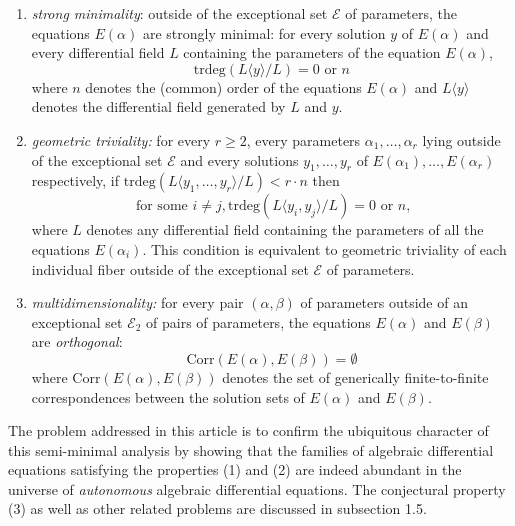 \documentclass[12pt]{amsart}
\theoremstyle{definition}
\theoremstyle{plain}
\theoremstyle{exampstyle}
\theoremstyle{exampstyle}\newtheorem{thmxbis}{Theorem}
\numberwithin{equation}{section}
\theoremstyle{remark}
\begin{document}
\begin{enumerate} 
\item {\em strong minimality}: outside of the exceptional set $\mathcal E$ of parameters,  the equations $E(\alpha)$ are  strongly minimal: for every solution $y$ of $E(\alpha)$ and every differential field $L$ containing the parameters of the equation $E(\alpha)$,
$$ \mathrm{trdeg}(L\langle y \rangle / L )  = 0 \text{ or } n$$
where $n$ denotes the (common) order of the equations $E(\alpha)$ and $L\langle y \rangle$ denotes the differential field generated by $L$ and $y$.

\item {\em geometric triviality:} for every $r \geq 2$, every parameters $\alpha_1,\ldots,\alpha_r$ lying outside of the exceptional set $\mathcal E$ and every solutions $y_1,\ldots, y_r$ of $E(\alpha_1),\ldots, E(\alpha_r)$ respectively, if $\mathrm{trdeg}(L\langle y_1,\ldots, y_r \rangle /L) < r \cdot n$ then 
$$ \text{ for some } i \neq j, \mathrm{trdeg}(L\langle y_i,y_j\rangle/L) = 0 \text{ or } n, $$
where $L$ denotes any differential field containing the parameters of all the equations $E(\alpha_i)$. This condition is equivalent to geometric triviality of each individual fiber  outside of the exceptional set $\mathcal E$ of parameters.

\item {\em multidimensionality:} for every pair $(\alpha,\beta)$ of parameters outside of an exceptional set $\mathcal E_2$ of pairs of parameters, the equations $E(\alpha)$ and $E(\beta)$ are {\em orthogonal}: 
$$ \mathrm{Corr}(E(\alpha),E(\beta)) = \emptyset$$ 
where $\mathrm{Corr}(E(\alpha),E(\beta)) $ denotes the set of generically finite-to-finite correspondences between the solution sets of $E(\alpha)$ and $E(\beta)$.

\end{enumerate} 
 
The problem addressed in this article is to confirm the ubiquitous character of this semi-minimal analysis by showing that  the families of algebraic differential equations satisfying the properties (1) and (2) are indeed abundant in the universe of {\em autonomous} algebraic differential equations. The conjectural property (3) as well as other related problems are discussed in subsection 1.5. 
\end{document}
